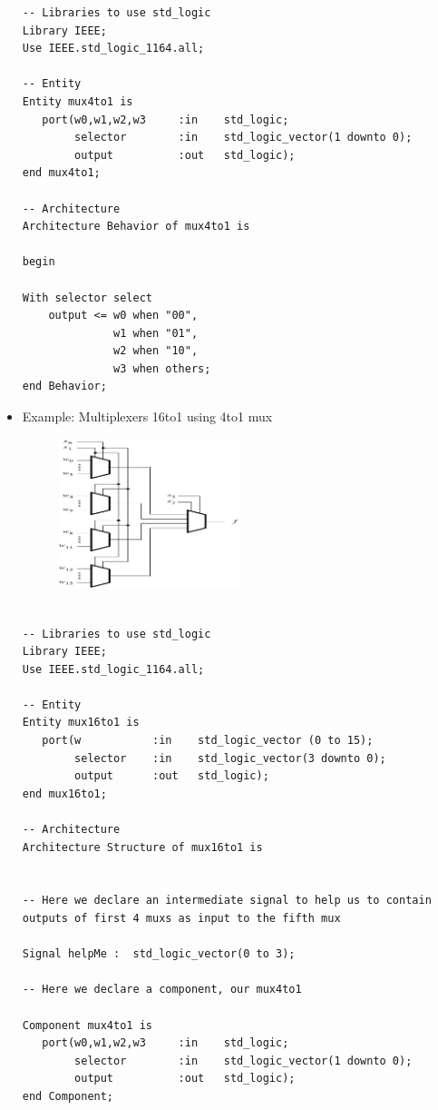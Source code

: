 \documentclass[a4paper]{article}
\begin{document}
\begin{itemize}
\begin{verbatim}
-- Libraries to use std_logic
Library IEEE;
Use IEEE.std_logic_1164.all;

-- Entity
Entity mux4to1 is 
   port(w0,w1,w2,w3     :in    std_logic;
        selector        :in    std_logic_vector(1 downto 0);
        output          :out   std_logic);
end mux4to1;

-- Architecture
Architecture Behavior of mux4to1 is

begin 

With selector select 
	output <= w0 when "00",
              w1 when "01",
              w2 when "10",
              w3 when others;
end Behavior;

\end{verbatim}

\item Example: Multiplexers 16to1 using 4to1 mux

\begin{figure}[H] 
	\centering
	\includegraphics[width=0.5\textwidth]{Multiplexers 16to1 using 4to1 mux}
	\label{fig:raw data}
\end{figure}


\begin{verbatim}

-- Libraries to use std_logic
Library IEEE;
Use IEEE.std_logic_1164.all;

-- Entity
Entity mux16to1 is 
   port(w           :in    std_logic_vector (0 to 15);
        selector    :in    std_logic_vector(3 downto 0);
        output      :out   std_logic);
end mux16to1;

-- Architecture
Architecture Structure of mux16to1 is


-- Here we declare an intermediate signal to help us to contain outputs of first 4 muxs as input to the fifth mux

Signal helpMe :  std_logic_vector(0 to 3);

-- Here we declare a component, our mux4to1

Component mux4to1 is 
   port(w0,w1,w2,w3     :in    std_logic;
        selector        :in    std_logic_vector(1 downto 0);
        output          :out   std_logic);
end Component;


\end{verbatim}
\end{itemize}
\end{document}
